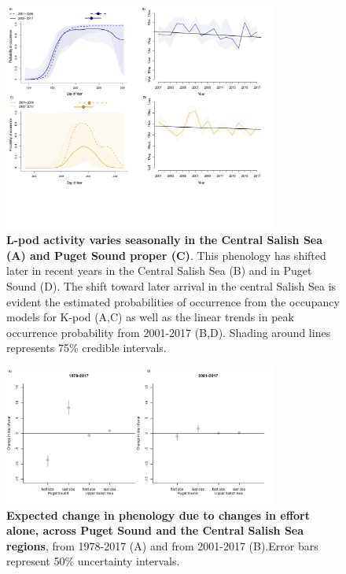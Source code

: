 \documentclass{article}
\begin{document}
\begin{figure}[!hp]
\includegraphics[width=0.8\textwidth]{../analyses/figures/proboccL_4panels.png} 
\caption{\textbf{L-pod activity varies seasonally in the Central Salish Sea (A) and Puget Sound proper (C)}. This phenology has shifted later in recent years in the Central Salish Sea (B) and in Puget Sound (D). The shift toward later arrival in the central Salish Sea is evident the estimated probabilities of occurrence from the occupancy models for K-pod (A,C) as well as the linear trends in peak occurrence probability from 2001-2017 (B,D). Shading around lines represents 75\% credible intervals. 
}
\label{fig:Lprobs}
\end{figure}

\begin{figure}[!hp]
\includegraphics[width=0.8\textwidth]{../analyses/orcaphen/figures/simeffortonly2panels.png} 
\caption{\textbf{Expected change in phenology due to changes in effort alone, across Puget Sound and the Central Salish Sea regions}, from 1978-2017 (A) and from 2001-2017 (B).Error bars represent 50\% uncertainty intervals. }
\label{fig:simeffort}
\end{figure}

\pagebreak


  
\end{document}
